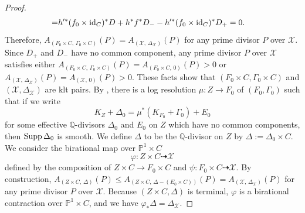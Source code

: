 \documentclass[12pt,twoside]{amsart}
\theoremstyle{definition}
\begin{document}
\begin{proof}
\begin{equation*}
\begin{split}
=&h'^{*}(f_{0}\times {\rm id}_{C})^{*}D+h^{*}f^{*}D_{-}-h'^{*}(f_{0}\times {\rm id}_{C})^{*}D_{+}=0.
\end{split}
\end{equation*}
Therefore, $A_{(F_{0} \times C,\, \Gamma_{0}\times C)}(P)=A_{(\mathcal{X},\, \Delta_{\mathcal{X}})}(P)$ for any prime divisor $P$ over $\mathcal{X}$. 
Since $D_{+}$ and $D_{-}$ have no common component, any prime divisor $P$ over $\mathcal{X}$ satisfies either $A_{(F_{0} \times C,\, \Gamma_{0}\times C)}(P)=A_{(F_{0} \times C,\, 0)}(P)>0$ or $A_{(\mathcal{X},\, \Delta_{\mathcal{X}})}(P)=A_{(\mathcal{X},\, 0)}(P)>0$.  
These facts show that $(F_{0}\times C,\Gamma_{0}\times C)$ and $(\mathcal{X},\Delta_{\mathcal{X}})$ are klt pairs.
By \cite[Proposition 2.36]{KM}, there is a log resolution $\mu \colon Z \to F_{0}$ of $(F_{0},\Gamma_{0})$ such that if we write 
$$K_{Z}+\Delta_{0} = \mu^{*}(K_{F_{0}}+\Gamma_{0})+E_{0}$$
for some effective $\mathbb{Q}$-divisors $\Delta_{0}$ and $E_{0}$ on $Z$ which have no common components, then ${\rm Supp}\,\Delta_{0}$ is smooth. 
We define $\Delta$ to be the $\mathbb{Q}$-divisor on $Z$ by $\Delta:=\Delta_{0}\times C$. 
We consider the birational map over $\mathbb{P}^{1}\times C$
$$\varphi \colon Z \times C \dashrightarrow \mathcal{X}$$
defined by the composition of $Z \times C \to F_{0} \times C$ and $\psi \colon F_{0} \times C \dashrightarrow \mathcal{X}$. 
By construction, $A_{(Z \times C, \, \Delta)}(P) \leq A_{(Z \times C, \, \Delta-(E_{0}\times C))}(P)= A_{(\mathcal{X},\, \Delta_{\mathcal{X}})}(P)$ for any prime divisor $P$ over $\mathcal{X}$. 
Because $(Z \times C, \Delta)$ is terminal, $\varphi$ is a birational contraction over $\mathbb{P}^{1}\times C$, and we have $\varphi_{*} \Delta=\Delta_{\mathcal{X}}$. 



\end{proof}
\end{document}
